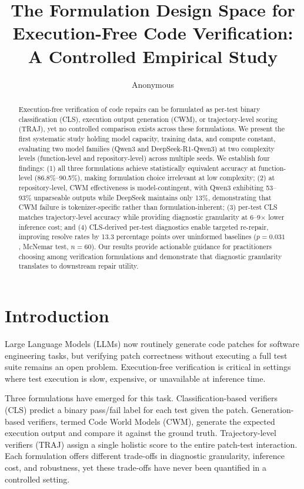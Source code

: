 \documentclass[11pt,a4paper]{article}
\title{The Formulation Design Space for Execution-Free Code Verification:\\A Controlled Empirical Study}
\author{Anonymous}
\begin{document}
\maketitle

\begin{abstract}
Execution-free verification of code repairs can be formulated as per-test binary classification (CLS), execution output generation (CWM), or trajectory-level scoring (TRAJ), yet no controlled comparison exists across these formulations. We present the first systematic study holding model capacity, training data, and compute constant, evaluating two model families (Qwen3 and DeepSeek-R1-Qwen3) at two complexity levels (function-level and repository-level) across multiple seeds. We establish four findings: (1) all three formulations achieve statistically equivalent accuracy at function-level (86.8\%--90.5\%), making formulation choice irrelevant at low complexity; (2) at repository-level, CWM effectiveness is model-contingent, with Qwen3 exhibiting 53--93\% unparseable outputs while DeepSeek maintains only 13\%, demonstrating that CWM failure is tokenizer-specific rather than formulation-inherent; (3) per-test CLS matches trajectory-level accuracy while providing diagnostic granularity at 6--9$\times$ lower inference cost; and (4) CLS-derived per-test diagnostics enable targeted re-repair, improving resolve rates by 13.3 percentage points over uninformed baselines ($p=0.031$, McNemar test, $n=60$). Our results provide actionable guidance for practitioners choosing among verification formulations and demonstrate that diagnostic granularity translates to downstream repair utility.
\end{abstract}

\section{Introduction}

Large Language Models (LLMs) now routinely generate code patches for software engineering tasks, but verifying patch correctness without executing a full test suite remains an open problem. Execution-free verification is critical in settings where test execution is slow, expensive, or unavailable at inference time.

Three formulations have emerged for this task. Classification-based verifiers (CLS) predict a binary pass/fail label for each test given the patch. Generation-based verifiers, termed Code World Models (CWM), generate the expected execution output and compare it against the ground truth. Trajectory-level verifiers (TRAJ) assign a single holistic score to the entire patch-test interaction. Each formulation offers different trade-offs in diagnostic granularity, inference cost, and robustness, yet these trade-offs have never been quantified in a controlled setting.
\end{document}
